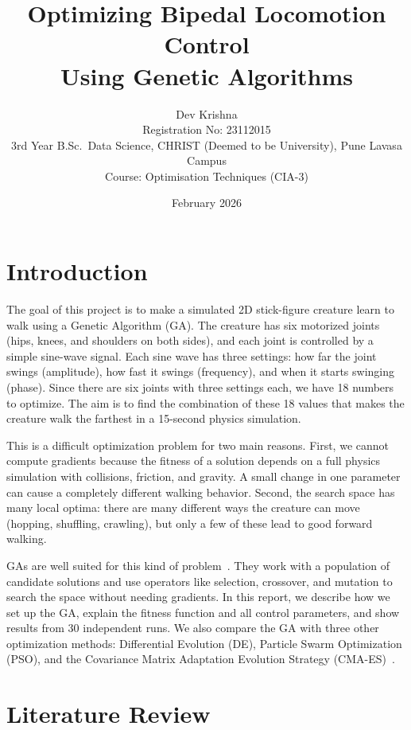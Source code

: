 \documentclass[11pt,a4paper]{article}
\title{\Large\textbf{Optimizing Bipedal Locomotion Control\\Using Genetic Algorithms}}
\author{Dev Krishna\\[2pt]
{\small Registration No: 23112015}\\
{\small 3rd Year B.Sc.\ Data Science, CHRIST (Deemed to be University), Pune Lavasa Campus}\\
{\small Course: Optimisation Techniques (CIA-3)}}
\date{\small February 2026}
\begin{document}
\maketitle
\thispagestyle{empty}

\section{Introduction}

The goal of this project is to make a simulated 2D stick-figure creature learn to walk using a Genetic Algorithm (GA). The creature has six motorized joints (hips, knees, and shoulders on both sides), and each joint is controlled by a simple sine-wave signal. Each sine wave has three settings: how far the joint swings (amplitude), how fast it swings (frequency), and when it starts swinging (phase). Since there are six joints with three settings each, we have 18 numbers to optimize. The aim is to find the combination of these 18 values that makes the creature walk the farthest in a 15-second physics simulation.

This is a difficult optimization problem for two main reasons. First, we cannot compute gradients because the fitness of a solution depends on a full physics simulation with collisions, friction, and gravity. A small change in one parameter can cause a completely different walking behavior. Second, the search space has many local optima: there are many different ways the creature can move (hopping, shuffling, crawling), but only a few of these lead to good forward walking.

GAs are well suited for this kind of problem~\cite{katoch2021}. They work with a population of candidate solutions and use operators like selection, crossover, and mutation to search the space without needing gradients. In this report, we describe how we set up the GA, explain the fitness function and all control parameters, and show results from 30 independent runs. We also compare the GA with three other optimization methods: Differential Evolution (DE), Particle Swarm Optimization (PSO), and the Covariance Matrix Adaptation Evolution Strategy (CMA-ES)~\cite{hansen2016}.

\section{Literature Review}
\end{document}
